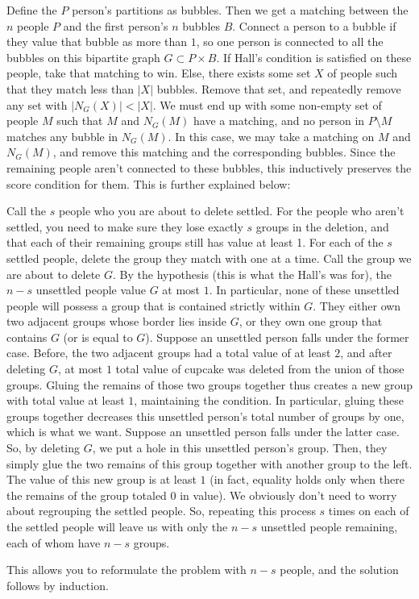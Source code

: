 Define the $P$ person's partitions as bubbles. Then we get a matching between the $n$ people $P$ and the first person's $n$ bubbles $B$. Connect a person to a bubble if they value that bubble as more than $1$, so one person is connected to all the bubbles on this bipartite graph $G \subset P \times B$. If Hall's condition is satisfied on these people, take that matching to win. Else, there exists some set $X$ of people such that they match less than $|X|$ bubbles. Remove that set, and repeatedly remove any set with $|N_G(X)| < |X|$. We must end up with some non-empty set of people $M$ such that $M$ and $N_G(M)$ have a matching, and no person in $P \setminus M$ matches any bubble in $N_G(M)$. In this case, we may take a matching on $M$ and $N_G(M)$, and remove this matching and the corresponding bubbles. Since the remaining people aren't connected to these bubbles, this inductively preserves the score condition for them. This is further explained below:


Call the $s$ people who you are about to delete settled. For the people who aren't settled, you need to make sure they lose exactly $s$ groups in the deletion, and that each of their remaining groups still has value at least 1. For each of the $s$ settled people, delete the group they match with one at a time. Call the group we are about to delete $G$. By the hypothesis (this is what the Hall's was for), the $n-s$ unsettled people value $G$ at most $1$. In particular, none of these unsettled people will possess a group that is contained strictly within $G$. They either own two adjacent groups whose border lies inside $G$, or they own one group that contains $G$ (or is equal to $G$).
Suppose an unsettled person falls under the former case. Before, the two adjacent groups had a total value of at least $2$, and after deleting $G$, at most $1$ total value of cupcake was deleted from the union of those groups. Gluing the remains of those two groups together thus creates a new group with total value at least $1$, maintaining the condition. In particular, gluing these groups together decreases this unsettled person's total number of groups by one, which is what we want.
Suppose an unsettled person falls under the latter case. So, by deleting $G$, we put a hole in this unsettled person's group. Then, they simply glue the two remains of this group together with another group to the left. The value of this new group is at least $1$ (in fact, equality holds only when there the remains of the group totaled $0$ in value).
We obviously don't need to worry about regrouping the settled people. So, repeating this process $s$ times on each of the settled people will leave us with only the $n-s$ unsettled people remaining, each of whom have $n-s$ groups.

This allows you to reformulate the problem with $n-s$ people, and the solution follows by induction.